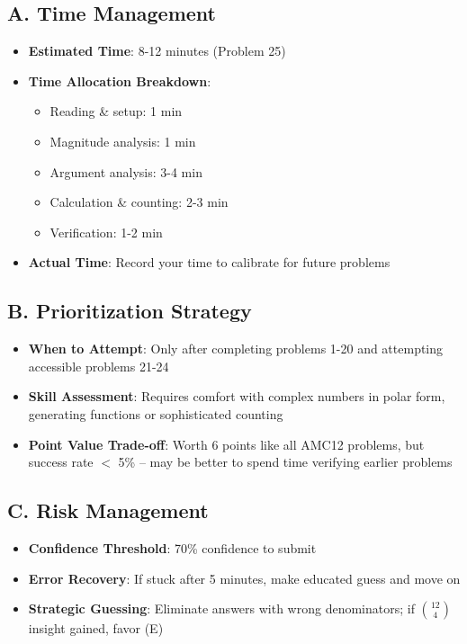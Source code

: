 \documentclass[]{article}
\begin{document}
\begin{competitionbox}
\subsection*{A. Time Management}
\begin{itemize}[leftmargin=*]
    \item \textbf{Estimated Time}: 8-12 minutes (Problem 25)
    \item \textbf{Time Allocation Breakdown}:
    \begin{itemize}
        \item Reading \& setup: 1 min
        \item Magnitude analysis: 1 min  
        \item Argument analysis: 3-4 min
        \item Calculation \& counting: 2-3 min
        \item Verification: 1-2 min
    \end{itemize}
    \item \textbf{Actual Time}: Record your time to calibrate for future problems
\end{itemize}

\subsection*{B. Prioritization Strategy}
\begin{itemize}[leftmargin=*]
    \item \textbf{When to Attempt}: Only after completing problems 1-20 and attempting accessible problems 21-24
    \item \textbf{Skill Assessment}: Requires comfort with complex numbers in polar form, generating functions or sophisticated counting
    \item \textbf{Point Value Trade-off}: Worth 6 points like all AMC12 problems, but success rate $<$ 5\% -- may be better to spend time verifying earlier problems
\end{itemize}

\subsection*{C. Risk Management}
\begin{itemize}[leftmargin=*]
    \item \textbf{Confidence Threshold}: 70\% confidence to submit
    \item \textbf{Error Recovery}: If stuck after 5 minutes, make educated guess and move on
    \item \textbf{Strategic Guessing}: Eliminate answers with wrong denominators; if $\binom{12}{4}$ insight gained, favor (E)
\end{itemize}


\end{competitionbox}
\end{document}
